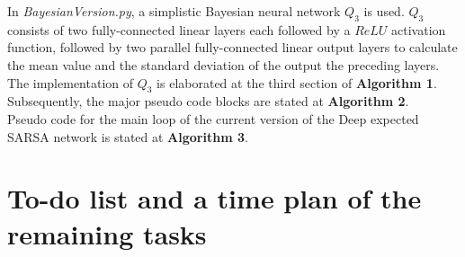 \documentclass{article}
\begin{document}
In \textit{BayesianVersion.py}, 
a simplistic Bayesian neural network $Q_3$ is used. $Q_3$ consists of two fully-connected linear layers each followed by a $ReLU$ activation function, 
followed by two parallel fully-connected linear output layers 
to calculate the mean value and the standard deviation of the output the preceding layers. \\
The implementation of $Q_3$ is elaborated at the third section of \textbf{Algorithm 1}.
Subsequently, the major pseudo code blocks are stated at \textbf{Algorithm 2}. \\
Pseudo code for the main loop of the current version of the Deep expected SARSA network is stated at \textbf{Algorithm 3}.

\section{To-do list and a time plan of the remaining tasks}
\end{document}
